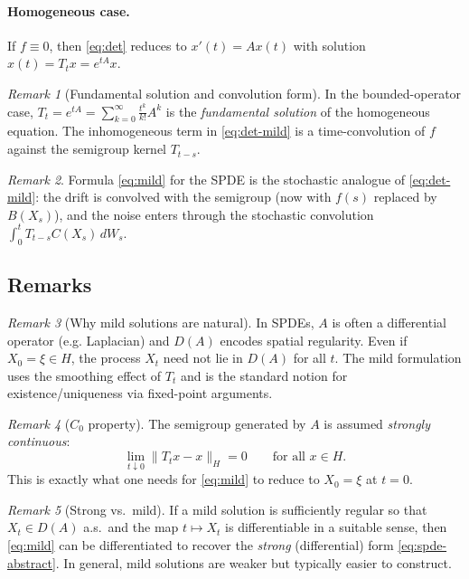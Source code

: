 \documentclass[11pt]{article}
\theoremstyle{definition}
\theoremstyle{remark}
\newtheorem{remark}{Remark}
\begin{document}
\paragraph{Homogeneous case.}
If $f \equiv 0$, then \eqref{eq:det} reduces to $x'(t)=Ax(t)$ with solution $x(t)=T_t x = e^{tA}x$.

\begin{remark}[Fundamental solution and convolution form]
In the bounded-operator case, $T_t=e^{tA}=\sum_{k=0}^\infty \frac{t^k}{k!}A^k$ is the \emph{fundamental solution} of the homogeneous equation.
The inhomogeneous term in \eqref{eq:det-mild} is a time-convolution of $f$ against the semigroup kernel $T_{t-s}$.
\end{remark}

\begin{remark}
Formula \eqref{eq:mild} for the SPDE is the stochastic analogue of \eqref{eq:det-mild}:
the drift is convolved with the semigroup (now with $f(s)$ replaced by $B(X_s)$), and the noise enters through the stochastic convolution
$\int_0^t T_{t-s}C(X_s)\,dW_s$.
\end{remark}

\subsection*{Remarks}

\begin{remark}[Why mild solutions are natural]
In SPDEs, $A$ is often a differential operator (e.g. Laplacian) and $D(A)$ encodes spatial regularity.
Even if $X_0=\xi \in H$, the process $X_t$ need not lie in $D(A)$ for all $t$.
The mild formulation uses the smoothing effect of $T_t$ and is the standard notion for existence/uniqueness via fixed-point arguments.
\end{remark}

\begin{remark}[$C_0$ property]
The semigroup generated by $A$ is assumed \emph{strongly continuous}:
\[
    \lim_{t \downarrow 0} \|T_t x - x\|_H = 0 \qquad \text{for all } x \in H.
\]
This is exactly what one needs for \eqref{eq:mild} to reduce to $X_0=\xi$ at $t=0$.
\end{remark}

\begin{remark}[Strong vs.\ mild]
If a mild solution is sufficiently regular so that $X_t \in D(A)$ a.s.\ and the map $t\mapsto X_t$ is differentiable in a suitable sense,
then \eqref{eq:mild} can be differentiated to recover the \emph{strong} (differential) form \eqref{eq:spde-abstract}.
In general, mild solutions are weaker but typically easier to construct.
\end{remark}
\end{document}
